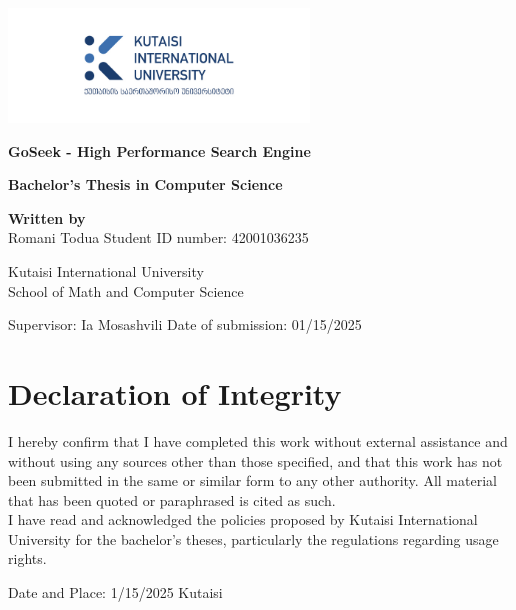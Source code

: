 \documentclass[12pt]{report}
\begin{document}
\begin{titlepage}
\begin{flushright} 
        \includegraphics[width=8cm]{kiu.jpg} %
    \end{flushright}
    \begin{center}
        \Huge
        \textbf{GoSeek - High Performance Search Engine}
        
        \LARGE
       \textbf{Bachelor's Thesis in Computer Science}
\end{center}
        
\begin{center}
        \textbf{Written by}\\
        Romani Todua
        Student ID number: 42001036235

        \vfill

        Kutaisi International University \\[0.3cm]
        School of Math and Computer Science

        \vfill
    \end{center}
        Supervisor: Ia Mosashvili
        Date of submission: 01/15/2025
    
\end{titlepage}

\section*{Declaration of Integrity}
I hereby confirm that I have completed this work without external assistance and without using any sources other than those specified, and that this work has not been submitted in the same or similar form to any other authority. All material that has been quoted or paraphrased is cited as such. \\
I have read and acknowledged the policies proposed by Kutaisi International University for the bachelor's theses, particularly the regulations regarding usage rights.

\vspace{2cm}
Date and Place: 1/15/2025 Kutaisi\\
\end{document}
